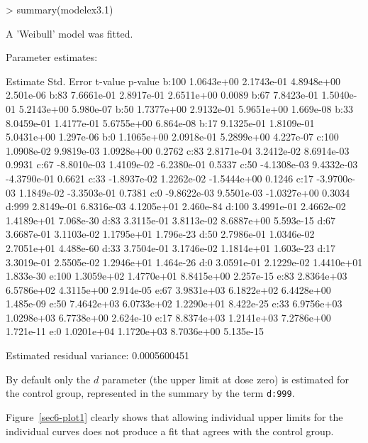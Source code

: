 \documentclass[a4paper]{article}
\begin{document}
\begin{Schunk}
\begin{Sinput}
> summary(modelex3.1)
\end{Sinput}
\begin{Soutput}
A 'Weibull' model was fitted.

Parameter estimates:

         Estimate  Std. Error     t-value   p-value
b:100  1.0643e+00  2.1743e-01  4.8948e+00 2.501e-06
b:83   7.6661e-01  2.8917e-01  2.6511e+00    0.0089
b:67   7.8423e-01  1.5040e-01  5.2143e+00 5.980e-07
b:50   1.7377e+00  2.9132e-01  5.9651e+00 1.669e-08
b:33   8.0459e-01  1.4177e-01  5.6755e+00 6.864e-08
b:17   9.1325e-01  1.8109e-01  5.0431e+00 1.297e-06
b:0    1.1065e+00  2.0918e-01  5.2899e+00 4.227e-07
c:100  1.0908e-02  9.9819e-03  1.0928e+00    0.2762
c:83   2.8171e-04  3.2412e-02  8.6914e-03    0.9931
c:67  -8.8010e-03  1.4109e-02 -6.2380e-01    0.5337
c:50  -4.1308e-03  9.4332e-03 -4.3790e-01    0.6621
c:33  -1.8937e-02  1.2262e-02 -1.5444e+00    0.1246
c:17  -3.9700e-03  1.1849e-02 -3.3503e-01    0.7381
c:0   -9.8622e-03  9.5501e-03 -1.0327e+00    0.3034
d:999  2.8149e-01  6.8316e-03  4.1205e+01 2.460e-84
d:100  3.4991e-01  2.4662e-02  1.4189e+01 7.068e-30
d:83   3.3115e-01  3.8113e-02  8.6887e+00 5.593e-15
d:67   3.6687e-01  3.1103e-02  1.1795e+01 1.796e-23
d:50   2.7986e-01  1.0346e-02  2.7051e+01 4.488e-60
d:33   3.7504e-01  3.1746e-02  1.1814e+01 1.603e-23
d:17   3.3019e-01  2.5505e-02  1.2946e+01 1.464e-26
d:0    3.0591e-01  2.1229e-02  1.4410e+01 1.833e-30
e:100  1.3059e+02  1.4770e+01  8.8415e+00 2.257e-15
e:83   2.8364e+03  6.5786e+02  4.3115e+00 2.914e-05
e:67   3.9831e+03  6.1822e+02  6.4428e+00 1.485e-09
e:50   7.4642e+03  6.0733e+02  1.2290e+01 8.422e-25
e:33   6.9756e+03  1.0298e+03  6.7738e+00 2.624e-10
e:17   8.8374e+03  1.2141e+03  7.2786e+00 1.721e-11
e:0    1.0201e+04  1.1720e+03  8.7036e+00 5.135e-15

Estimated residual variance: 0.0005600451 
\end{Soutput}
\end{Schunk}
By default only the $d$ parameter (the upper limit at dose zero) is estimated for the control group, represented in the summary by the term \verb+d:999+.

Figure~\ref{sec6-plot1} clearly shows that allowing individual upper limits for the individual curves does not produce a fit that agrees with the
control group.
\end{document}

